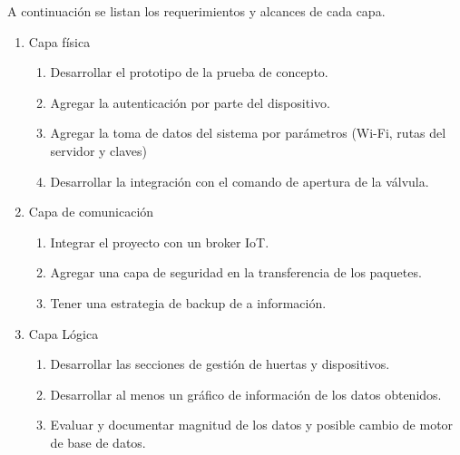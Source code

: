 A continuación se listan los requerimientos y alcances de cada capa.
\begin{enumerate}
\item Capa física
	\begin{enumerate}
		\item Desarrollar el prototipo de la prueba de concepto.
		\item Agregar la autenticación por parte del dispositivo.
		\item Agregar la toma de datos del sistema por parámetros (Wi-Fi, rutas del servidor y claves)
		\item Desarrollar la integración con el comando de apertura de la válvula.
	\end{enumerate}
\item Capa de comunicación
	\begin{enumerate}
		\item Integrar el proyecto con un broker IoT.
		\item Agregar una capa de seguridad en la transferencia de los paquetes.
		\item Tener una estrategia de backup de a información.
	\end{enumerate}
\item Capa Lógica
	\begin{enumerate}
		\item Desarrollar las secciones de gestión de huertas y dispositivos.
		\item Desarrollar al menos un gráfico de información de los datos obtenidos.
		\item Evaluar y documentar magnitud de los datos y posible cambio de motor de base de datos. 
	\end{enumerate}
\end{enumerate}


